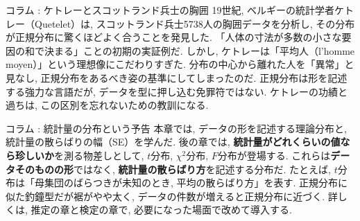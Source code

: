 \begin{mybox}{コラム : ケトレーとスコットランド兵士の胸囲}
    19世紀, ベルギーの統計学者ケトレー（Quetelet）は, スコットランド兵士5738人の胸囲データを分析し, その分布が正規分布に驚くほどよく合うことを発見した.
    「人体の寸法が多数の小さな要因の和で決まる」ことの初期の実証例だ.
    しかし, ケトレーは「平均人（l'homme moyen）」という理想像にこだわりすぎた.
    分布の中心から離れた人を「異常」と見なし, 正規分布をあるべき姿の基準にしてしまったのだ.
    正規分布は形を記述する強力な言語だが, データを型に押し込む免罪符ではない.
    ケトレーの功績と過ちは, この区別を忘れないための教訓になる.
\end{mybox}

\begin{mybox}{コラム : 統計量の分布という予告}
    本章では, データの形を記述する理論分布と, 統計量の散らばりの幅（SE）を学んだ.
    後の章では, \textbf{統計量がどれくらいの値なら珍しいか}を測る物差しとして, $t$分布, $\chi^2$分布, $F$分布が登場する.
    これらは\textbf{データそのものの形}ではなく, \textbf{統計量の散らばり方}を記述する分布だ.
    たとえば, $t$分布は「母集団のばらつきが未知のとき, 平均の散らばり方」を表す.
    正規分布に似た釣鐘型だが裾がやや太く, データの件数が増えると正規分布に近づく.
    詳しくは, 推定の章と検定の章で, 必要になった場面で改めて導入する.
\end{mybox}
